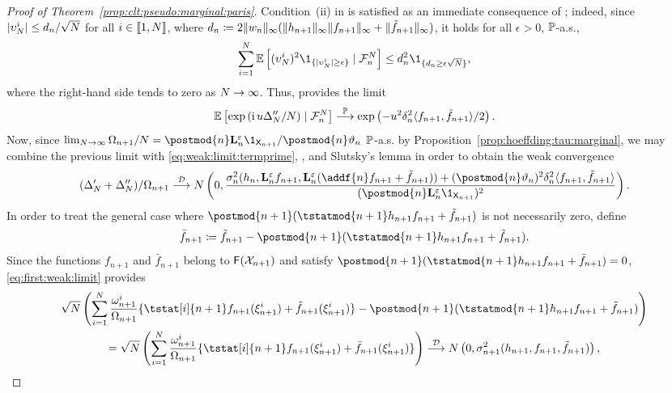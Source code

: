 \begin{proof}[Proof of Theorem~\ref{prop:clt:pseudo:marginal:paris}]
Condition~(ii) in \cite[Theorem~A.3]{douc:moulines:2008} is satisfied as an immediate consequence of  ; indeed, since $| \upsilon^i_N | \leq d_n / \sqrt{N}$ for all $i \in \llbracket 1, N \rrbracket$, where 
$d_n \coloneqq 2 \| w_{n} \|_\infty (\| h_{n + 1} \|_\infty \| f_{n + 1} \|_\infty + \| \tilde{f}_{n + 1} \|_\infty)$, it holds for all $\epsilon>0$, $\mathbb{P}$-a.s.,
\[
\sum_{i = 1}^\N \pE \left[ (\upsilon^i_\N)^2 \1_{\{|\upsilon^i_\N| \geq \epsilon\}} \cond \calF{n}{\N} \right] \leq d_n^2 \1_{\{ d_n \geq \epsilon \sqrt{\N} \}}, 
\]
where the right-hand side tends to zero as $N \to \infty$. Thus, \cite[Theorem~A.3]{douc:moulines:2008} provides the limit 
$$
\mathbb{E} \left[ \exp \left(\operatorname{i} u \Delta_N^{\prime \prime} / N \right) \mid \mathcal{F}_{n}^{N} \right] \stackrel{\mathbb{P}}{\longrightarrow} \exp \left( - u^2 \delta_n^2 \langle f_{n + 1}, \tilde{f}_{n + 1} \rangle / 2 \right).    
$$
Now, since $\lim_{\N \to \infty} \sumwght{n + 1} / \N = \postmod{n} \ukmod{n} \1_{\Xset_{n + 1}} / \postmod{n} \adjfuncforward{n}$ $\mathbb{P}$-a.s. by Proposition~\ref{prop:hoeffding:tau:marginal}, we may combine the previous limit with \eqref{eq:weak:limit:termprime}, \cite[Lemma~A.5]{delmoral:moulines:olsson:verge:2016}, and Slutsky's lemma in order to obtain the weak convergence  
\begin{equation} \label{eq:first:weak:limit}
(\termprime + \termbis) / \sumwght{n + 1} \dlim N \left( 0, \frac{\sigma_n^2(h_n, \ukmod{n} f_{n + 1}, \ukmod{n}(\addf{n} f_{n + 1} + \ftd{n + 1})) + (\postmod{n} \adjfuncforward{n})^2 \incrementalvar_n^2 \langle f_{n + 1}, \ftd{n + 1} \rangle}{(\postmod{n} \ukmod{n} \1_{\Xset_{n + 1}})^2} \right).    
\end{equation}
In order to treat the general case where $\postmod{n + 1}(\tstatmod{n + 1} h_{n + 1} f_{n + 1} + \ftd{n + 1})$ is not necessarily zero, define 
\[
\bar{f}_{n + 1} \eqdef \ftd{n + 1} - \postmod{n + 1}(\tstatmod{n + 1} h_{n + 1} f_{n + 1} + \ftd{n + 1}). 
\]
Since the functions $f_{n + 1}$ and $\bar{f}_{n + 1}$ belong to $\mathsf{F}(\mathcal{X}_{n + 1})$ and satisfy $\postmod{n + 1}(\tstatmod{n + 1} h_{n+1} f_{n + 1} + \bar{f}_{n + 1}) = 0$, \eqref{eq:first:weak:limit} provides    
\begin{multline*}
\sqrt{\N} \left( \sum_{i = 1}^\N \frac{\ewght{n + 1}{i}}{\sumwght{n + 1}}\{\tstat[i]{n + 1} f_{n + 1}(\epart{n + 1}{i}) +  \ftd{n + 1}(\epart{n + 1}{i})\} - \postmod{n + 1}(\tstatmod{n + 1} h_{n + 1} f_{n + 1} + \ftd{n + 1}) \right) \\
= \sqrt{\N} \left( \sum_{i = 1}^\N \frac{\ewght{n + 1}{i}}{\sumwght{n + 1}}\{\tstat[i]{n + 1} f_{n + 1}(\epart{n + 1}{i}) +  \bar{f}_{n + 1}(\epart{n + 1}{i})\} \right) \dlim N \left(0, \sigma_{n + 1}^2 (h_{n + 1}, f_{n + 1}, \ftd{n + 1}) \right), 

\end{multline*}
\end{proof}
